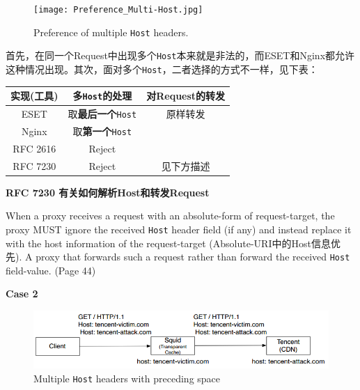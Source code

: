 \vspace{2ex}


\begin{figure}[!htbp]
	\centering
	\texttt{[image: Preference\_Multi-Host.jpg]}
	\caption{Preference of multiple \texttt{Host} headers.}
	\label{fig:preference_multi-Host}
\end{figure}

首先，在同一个Request中出现多个\texttt{Host}本来就是非法的，而ESET和Nginx都允许这种情况出现。其次，面对多个\texttt{Host}，二者选择的方式不一样，见下表：

\begin{tabular}{|c|c|c|}
	\hline 
	\textbf{实现(工具)} & \textbf{多\texttt{Host}的处理} & \textbf{对Request的转发}  \\  
	\hline 
	ESET & 取\textbf{最后一个}\texttt{Host} & 原样转发 \\ 
	\hline 
	Nginx & 取\textbf{第一个}\texttt{Host} & \\
	\hline
	\hline
	RFC 2616 & Reject & \\
	\hline
	RFC 7230 & Reject & 见下方描述\\
	\hline
\end{tabular} 

\begin{spacing}{0.8}
	\begin{tcolorbox}
		\textbf{RFC 7230 有关如何解析Host和转发Request}
		 
		When a proxy receives a request with an absolute-form of request-target, the proxy MUST ignore the received \texttt{Host} header field (if any) and instead replace it with the host information of the
		request-target (Absolute-URI中的Host信息优先). A proxy that forwards such a request {\color{red}{MUST generate a new Host field-value based on the received request-target}} rather than forward the received \texttt{Host} field-value. (Page 44)
	\end{tcolorbox}
\end{spacing}

\vspace{2ex}

\textbf{Case 2}

\begin{figure}[tbph!]
	\centering
	\includegraphics[width=1.0\linewidth]{images/Multi-Host_Preceding_Space}
	\caption{Multiple \texttt{Host} headers with preceding space}
	\label{fig:multi-hostprecedingspace}
\end{figure}


